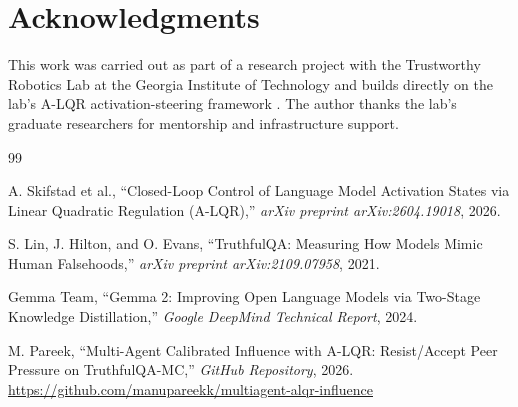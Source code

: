 \documentclass[10pt, twocolumn, a4paper]{article}
\begin{document}
\section*{Acknowledgments}
This work was carried out as part of a research project with the Trustworthy Robotics Lab at the Georgia Institute of Technology and builds directly on the lab's A-LQR activation-steering framework \cite{skifstad2026alqr}. The author thanks the lab's graduate researchers for mentorship and infrastructure support.

\begin{thebibliography}{99}

A. Skifstad et al., ``Closed-Loop Control of Language Model Activation States via Linear Quadratic Regulation (A-LQR),'' \textit{arXiv preprint arXiv:2604.19018}, 2026.

S. Lin, J. Hilton, and O. Evans, ``TruthfulQA: Measuring How Models Mimic Human Falsehoods,'' \textit{arXiv preprint arXiv:2109.07958}, 2021.

Gemma Team, ``Gemma 2: Improving Open Language Models via Two-Stage Knowledge Distillation,'' \textit{Google DeepMind Technical Report}, 2024.

M. Pareek, ``Multi-Agent Calibrated Influence with A-LQR: Resist/Accept Peer Pressure on TruthfulQA-MC,'' \textit{GitHub Repository}, 2026. \url{https://github.com/manupareekk/multiagent-alqr-influence}

\end{thebibliography}
\end{document}
